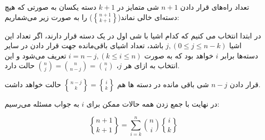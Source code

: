     تعداد راه‌های قرار دادن
    $n+1$
    شی متمایز در
    $k+1$
    دسته یکسان به صورتی که هیچ دسته‌ای خالی نماند($\genfrac{\{}{\}}{0pt}{}{n + 1}{k + 1}$) را به صورت زیر می‌شماریم:
    
    در ابتدا انتخاب می کنیم که کدام اشیا با شی اول در یک دسته قرار دارند، اگر تعداد این اشیا $j, (0 \leq j \leq n - k)$ باشد،
    تعداد اشیای باقی‌مانده جهت قرار دادن در سایر دسته‌ها برابر
    $i$
    خواهد بود که به صورت
    $i= n-j ,(k \leq i \leq n)$
    تعریف می‌شود و این انتخاب
    به ازای هر $j$، ${n\choose j}={n \choose n-j}={n\choose i}$ حالت دارد.
    
	قرار دادن $n-j$ شی باقی مانده در دسته ها هم $\genfrac{\{}{\}}{0pt}{}{n-j}{k}=\genfrac{\{}{\}}{0pt}{}{i}{k}$ حالت خواهد داشت.

    
	در نهایت با جمع زدن همه حالات ممکن برای $i$ به جواب مسئله می‌رسیم:
    
    $$\genfrac{\{}{\}}{0pt}{}{n + 1}{k + 1} = \sum\limits_{i=k}^{n} {n\choose i} \genfrac{\{}{\}}{0pt}{}{i}{k}$$
